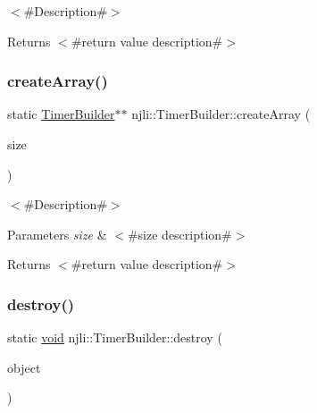 $<$\#\+Description\#$>$

\begin{DoxyReturn}{Returns}
$<$\#return value description\#$>$ 
\end{DoxyReturn}
\mbox{\label{classnjli_1_1_timer_builder_a716e86de4e5e8be3e464bd39ed625da3}} 
\subsubsection{\texorpdfstring{create\+Array()}{createArray()}}
{\footnotesize\ttfamily static \mbox{\hyperlink{classnjli_1_1_timer_builder}{Timer\+Builder}}$\ast$$\ast$ njli\+::\+Timer\+Builder\+::create\+Array (\begin{DoxyParamCaption}\item[{const \mbox{\hyperlink{_util_8h_a10e94b422ef0c20dcdec20d31a1f5049}{u32}}}]{size }\end{DoxyParamCaption})\hspace{0.3cm}{\ttfamily [static]}}

$<$\#\+Description\#$>$


\begin{DoxyParams}{Parameters}
{\em size} & $<$\#size description\#$>$\\
\hline
\end{DoxyParams}
\begin{DoxyReturn}{Returns}
$<$\#return value description\#$>$ 
\end{DoxyReturn}
\mbox{\label{classnjli_1_1_timer_builder_a3602b82600cf60b9ef389ecc77e9ec93}} 
\subsubsection{\texorpdfstring{destroy()}{destroy()}}
{\footnotesize\ttfamily static \mbox{\hyperlink{_thread_8h_af1e856da2e658414cb2456cb6f7ebc66}{void}} njli\+::\+Timer\+Builder\+::destroy (\begin{DoxyParamCaption}\item[{\mbox{\hyperlink{classnjli_1_1_timer_builder}{Timer\+Builder}} $\ast$}]{object }\end{DoxyParamCaption})\hspace{0.3cm}{\ttfamily [static]}}

